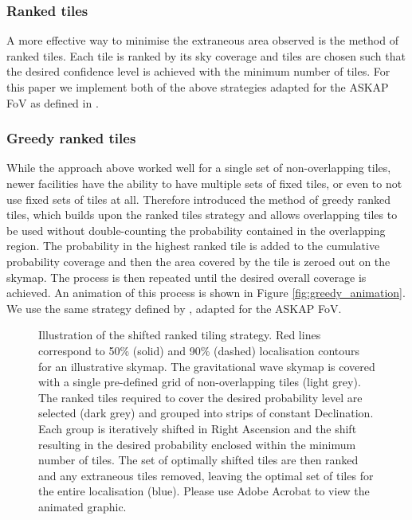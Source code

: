 \subsubsection{Ranked tiles}
A more effective way to minimise the extraneous area observed is the method of ranked tiles. Each tile is ranked by its sky coverage and tiles are chosen such that the desired confidence level is achieved with the minimum number of tiles. For this paper we implement both of the above strategies adapted for the ASKAP FoV as defined in \citet{2016A&A...592A..82G}.

\subsubsection{Greedy ranked tiles}
\label{sec:greedy_ranked_tiles}
While the approach above worked well for a single set of non-overlapping tiles, newer facilities have the ability to have multiple sets of fixed tiles, or even to not use fixed sets of tiles at all. Therefore \citet{2017PASP..129k4503G} introduced the method of greedy ranked tiles, which builds upon the ranked tiles strategy and allows overlapping tiles to be used without double-counting the probability contained in the overlapping region. The probability in the highest ranked tile is added to the cumulative probability coverage and then the area covered by the tile is zeroed out on the skymap. The process is then repeated until the desired overall coverage is achieved. An animation of this process is shown in Figure \ref{fig:greedy_animation}. We use the same strategy defined by \citet{2017PASP..129k4503G}, adapted for  the ASKAP FoV.

\begin{figure}
    \caption[Illustration of the shifted ranked tiling strategy]{Illustration of the shifted ranked tiling strategy. Red lines correspond to 50\% (solid) and 90\% (dashed) localisation contours for an illustrative skymap. The gravitational wave skymap is covered with a single pre-defined grid of non-overlapping tiles (light grey). The ranked tiles required to cover the desired probability level are selected (dark grey) and grouped into strips of constant Declination. Each group is iteratively shifted in Right Ascension and the shift resulting in the desired probability enclosed within the minimum number of tiles. The set of optimally shifted tiles are then ranked and any extraneous tiles removed, leaving the optimal set of tiles for the entire localisation (blue). Please use Adobe Acrobat to view the animated graphic.}
    \label{fig:shifted_animation}
\end{figure}


